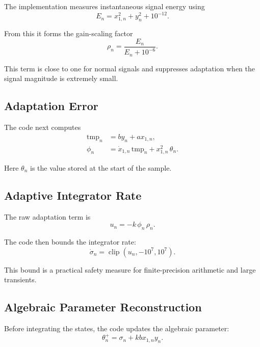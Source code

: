 \documentclass[conference]{IEEEtran}
\begin{document}
The implementation measures instantaneous signal energy using
\begin{equation}
  E_n = x_{1,n}^2 + y_n^2 + 10^{-12}.
\end{equation}

From this it forms the gain-scaling factor
\begin{equation}
  \rho_n = \frac{E_n}{E_n + 10^{-6}}.
\end{equation}

This term is close to one for normal signals and suppresses adaptation when
the signal magnitude is extremely small.

\subsection{Adaptation Error}

The code next computes
\begin{align}
  \text{tmp}_n &= b y_n + a x_{1,n},\\
  \phi_n &= \dot{x}_{1,n}\,\text{tmp}_n + x_{1,n}^2\,\theta_n.
\end{align}

Here $\theta_n$ is the value stored at the start of the sample.

\subsection{Adaptive Integrator Rate}

The raw adaptation term is
\begin{equation}
  u_n = -k\,\phi_n\,\rho_n.
\end{equation}

The code then bounds the integrator rate:
\begin{equation}
  \dot{\sigma}_n = \operatorname{clip}(u_n,-10^7,10^7).
\end{equation}

This bound is a practical safety measure for finite-precision arithmetic and
large transients.

\subsection{Algebraic Parameter Reconstruction}

Before integrating the states, the code updates the algebraic parameter:
\begin{equation}
  \theta_n^{+} = \sigma_n + k b x_{1,n} y_n.
\end{equation}
\end{document}
